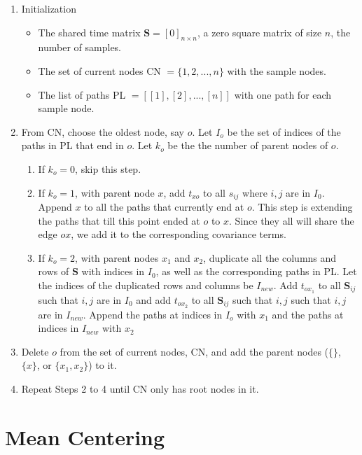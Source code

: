 \begin{enumerate}
    \item Initialization 
    \begin{itemize}
        \item The shared time matrix $\mathbf{S} = [0]_{n \times n}$, a zero square matrix of size $n$, the number of samples.
        \item The set of current nodes CN $= \{1,2,...,n \}$ with the sample nodes.
        \item The list of paths PL $= [ [1], [2],..., [n]  ] $ with one path for each sample node. 
    \end{itemize}
    \item From CN, choose the oldest node, say $o$. Let $I_o$ be the set of indices of the paths in PL that end in $o$. Let $k_o$ be the the number of parent nodes of $o$. 
    \begin{enumerate}
        \item If $k_o=0$, skip this step. 
        \item If $k_o=1$, with parent node $x$, add $t_{xo}$ to all $s_{ij}$ where $i,j$ are in $I_0$. Append $x$ to all the paths that currently end at $o$.
        This step is extending the paths that till this point ended at $o$ to $x$. Since they all will share the edge $ox$, we add it to the corresponding covariance terms.
        \item If $k_o=2$, with parent nodes $x_1$ and $x_2$, duplicate all the columns and rows of $\mathbf{S}$ with indices in $I_0$, as well as the corresponding paths in PL. Let the indices of the duplicated rows and columns be $I_{new}$. Add $t_{ox_1}$ to all $\mathbf{S}_{ij}$ such that $i,j$ are in $I_0$ and add $t_{ox_2}$ to all $\mathbf{S}_{ij}$ such that $i,j$ such that $i,j$ are in $I_{new}$. Append the paths at indices in $I_o$ with $x_1$ and the paths at indices in $I_{new}$ with $x_2$
    \end{enumerate}
    \item Delete $o$ from the set of current nodes, CN, and add the parent nodes ($\{\}$, $\{x\}$, or $\{x_1,x_2\}$) to it. 
    \item Repeat Steps 2 to 4 until CN only has root nodes in it. 
\end{enumerate}


\section{Mean Centering}

